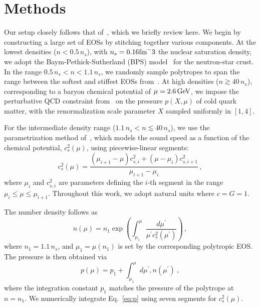 \documentclass[twocolumn]{aastex631}
\begin{document}
\section{Methods} \label{sec:Methods}
	
Our setup closely follows that of~\citet{Altiparmak:2022}, which we briefly review here. 
We begin by constructing a large set of EOSs by stitching together various components.
At the lowest densities ($n<0.5\,n_s$), with $n_s=0.16{\rm fm}^-3$ the nuclear saturation density, we adopt the Baym-Pethick-Sutherland (BPS) model~\citep{Baym71} for the neutron-star crust.
In the range $0.5\,n_s < n < 1.1\,n_s$, we randomly sample polytropes to span the range between the softest and stiffest EOSs from~\citet{Hebeler:2013nza}.
At high densities ($n \gtrsim 40\,n_s$), corresponding to a baryon chemical potential of $\mu = 2.6\,\rm GeV$, we impose the perturbative QCD constraint from~\citet{Fraga2014} on the pressure $p(X, \mu)$ of cold quark matter, with the renormalization scale parameter $X$ sampled uniformly in $[1,4]$.
	
For the intermediate density range ($1.1\,n_s < n \lesssim 40\,n_s$), we use the parametrization method of~\citet{Annala2019}, which models the sound speed as a function of the chemical potential, $c_s^2(\mu)$, using piecewise-linear segments:
\begin{equation} \label{eq:cs2}
 c_s^2(\mu) = \frac{\left(\mu_{i+1}-\mu \right) c_{s,i}^2 + \left(\mu - \mu_i \right) c_{s,i+1}^2}{\mu_{i+1}-\mu_i}\,, 
\end{equation}
where $\mu_i$ and $c_{s,i}^2$ are parameters defining the $i$-th segment in the range $\mu_i \leq \mu \leq \mu_{i+1}$.
Throughout this work, we adopt natural units where $c=G=1$.

The number density follows as 
\begin{equation} \label{eq:n}
 n(\mu) = n_1 \exp \left({\int_{\mu_1}^\mu \frac{d\mu^\prime}{\mu^\prime c_s^2(\mu^\prime)}}\right)\,, 
\end{equation} 
where $n_1 = 1.1\,n_s$, and $\mu_1 = \mu(n_1)$ is set by the corresponding polytropic EOS.
The pressure is then obtained via
\begin{equation} \label{eq:p}
 p(\mu) = p_1 + \int_{\mu_1}^\mu d\mu^\prime , n(\mu^\prime)~,
\end{equation}
where the integration constant $p_1$ matches the pressure of the polytrope at $n = n_1$.
We numerically integrate Eq.~\eqref{eq:p} using seven segments for $c_s^2(\mu)$.
\end{document}
